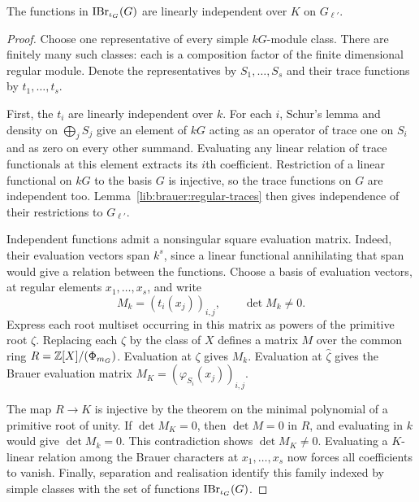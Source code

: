 \begin{theorem}
\label{lib:brauer:independence}
The functions in $\operatorname{IBr}_{\iota_G}(G)$ are linearly independent over $K$
on $G_{\ell'}$.
\end{theorem}
\begin{proof}
Choose one representative of every simple $kG$-module class. There are
finitely many such classes: each is a composition factor of the finite
dimensional regular module. Denote the representatives by
$S_1,\ldots,S_s$ and their trace functions by $t_1,\ldots,t_s$.

First, the $t_i$ are linearly independent over $k$. For each $i$, Schur's
lemma and density on $\bigoplus_jS_j$ give an element of $kG$ acting as
an operator of trace one on $S_i$ and as zero on every other summand.
Evaluating any linear relation of trace functionals at this element
extracts its $i$th coefficient. Restriction of a linear functional on
$kG$ to the basis $G$ is injective, so the trace functions on $G$ are
independent too. Lemma~\ref{lib:brauer:regular-traces} then gives
independence of their restrictions to $G_{\ell'}$.

Independent functions admit a nonsingular square evaluation matrix.
Indeed, their evaluation vectors span $k^s$, since a linear functional
annihilating that span would give a relation between the functions.
Choose a basis of evaluation vectors, at regular elements
$x_1,\ldots,x_s$, and write
\[
 M_k=(t_i(x_j))_{i,j},\qquad \det M_k\ne0.
\]
Express each root multiset occurring in this matrix as powers of the
primitive root $\zeta$. Replacing each $\zeta$ by the class of $X$
defines a matrix $M$ over the common ring
$R=\mathbb Z[X]/(\Phi_{m_G})$. Evaluation at $\zeta$ gives $M_k$.
Evaluation at $\widehat\zeta$ gives the Brauer evaluation matrix
$M_K=(\varphi_{S_i}(x_j))_{i,j}$.

The map $R\to K$ is injective by the theorem on the minimal polynomial of a primitive root of unity. If $\det M_K=0$, then $\det M=0$ in $R$, and evaluating in
$k$ would give $\det M_k=0$. This contradiction shows
$\det M_K\ne0$. Evaluating a $K$-linear relation among the Brauer
characters at $x_1,\ldots,x_s$ now forces all coefficients to vanish.
Finally, separation and realisation identify this family indexed by
simple classes with the set of functions $\operatorname{IBr}_{\iota_G}(G)$.
\end{proof}


